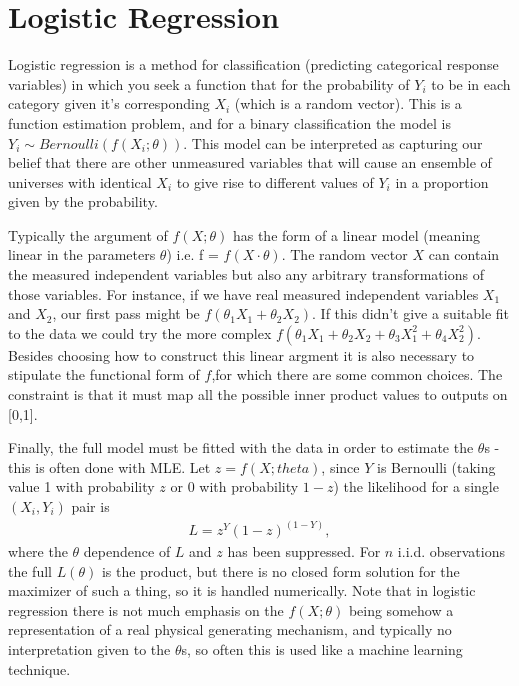 \section{Logistic Regression}
Logistic regression is a method for classification (predicting categorical response variables) in which you seek a function that for the probability of $Y_i$ to be in each category given it's corresponding $X_i$ (which is a random vector). This is a function estimation problem, and for a binary classification the model is $Y_i \sim Bernoulli(f(X_i; \theta))$. This model can be interpreted as capturing our belief that there are other unmeasured variables that will cause an ensemble of universes with identical $X_i$ to give rise to different values of $Y_i$ in a proportion given by the probability. 
\n

Typically the argument of $f(X; \theta)$ has the form of a linear model (meaning linear in the parameters $\theta$) i.e. f = $f(X\cdot \theta)$. The random vector $X$ can contain the measured independent variables but also any arbitrary transformations of those variables. For instance, if we have real measured independent variables $X_1$ and $X_2$, our first pass might be $f(\theta_1X_1 + \theta_2X_2)$.  If this didn't give a suitable fit to the data we could try the more complex $f(\theta_1X_1 + \theta_2X_2 + \theta_3X_1^2 + \theta_4X_2^2)$. Besides choosing how to construct this linear argment it is also necessary to stipulate the functional form of $f$,for which there are some common choices. The constraint is that it must map all the possible inner product values to outputs on [0,1]. 
\n

Finally, the full model must be fitted with the data in order to estimate the $\theta$s - this is often done with MLE. Let $z = f(X; theta)$, since $Y$ is Bernoulli (taking value 1 with probability $z$ or 0 with probability $1-z$) the likelihood for a single $(X_i, Y_i)$ pair is
\begin{align*}
L = z^Y (1-z)^{(1-Y)},
\end{align*}
where the $\theta$ dependence of $L$ and $z$ has been suppressed. For $n$ i.i.d. observations the full $L(\theta)$ is the product, but there is no closed form solution for the maximizer of such a thing, so it is handled numerically. Note that in logistic regression there is not much emphasis on the $f(X; \theta)$ being somehow a representation of a real physical generating mechanism, and typically no interpretation given to the $\theta$s, so often this is used like a machine learning technique. 


